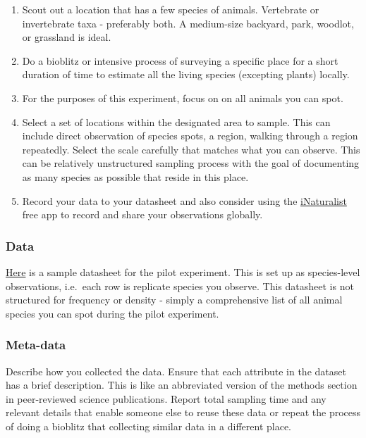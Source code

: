 \documentclass[
]{book}
\providecommand{\tightlist}{%
  \setlength{\itemsep}{0pt}\setlength{\parskip}{0pt}}
\begin{document}
\begin{enumerate}
\def\labelenumi{\arabic{enumi}.}
\tightlist
\item
  Scout out a location that has a few species of animals. Vertebrate or invertebrate taxa - preferably both. A medium-size backyard, park, woodlot, or grassland is ideal.\\
\item
  Do a bioblitz or intensive process of surveying a specific place for a short duration of time to estimate all the living species (excepting plants) locally.\\
\item
  For the purposes of this experiment, focus on on all animals you can spot.\\
\item
  Select a set of locations within the designated area to sample. This can include direct observation of species spots, a region, walking through a region repeatedly. Select the scale carefully that matches what you can observe. This can be relatively unstructured sampling process with the goal of documenting as many species as possible that reside in this place.\\
\item
  Record your data to your datasheet and also consider using the \href{https://www.inaturalist.org}{iNaturalist} free app to record and share your observations globally.
\end{enumerate}

\hypertarget{data-1}{%
\subsubsection*{Data}\label{data-1}}

\href{https://figshare.com/articles/dataset/BIOL3250_bioblitz_datasheet/12792455}{Here} is a sample datasheet for the pilot experiment. This is set up as species-level observations, i.e.~each row is replicate species you observe. This datasheet is not structured for frequency or density - simply a comprehensive list of all animal species you can spot during the pilot experiment.

\hypertarget{meta-data-1}{%
\subsubsection*{Meta-data}\label{meta-data-1}}

Describe how you collected the data. Ensure that each attribute in the dataset has a brief description. This is like an abbreviated version of the methods section in peer-reviewed science publications. Report total sampling time and any relevant details that enable someone else to reuse these data or repeat the process of doing a bioblitz that collecting similar data in a different place.
\end{document}
